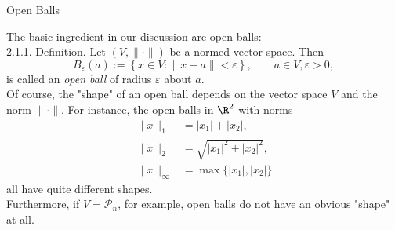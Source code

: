 \documentclass[smaller,hyperref={CJKbookmarks=true}]{beamer}
\begin{document}
\begin{frame}[t,shrink]{Open Balls}
\begin{spacing}{1}
The basic ingredient in our discussion are open balls:\\
\alert{2.1.1. Definition.} Let $(V,\|\cdot\|)$ be a normed vector space. Then
\setcounter{equation}{0}
\begin{equation}\label{2.1.1}
  B_\varepsilon(a):=\left\{x\in V:\|x-a\|<\varepsilon\right\},\qquad a\in V,\varepsilon>0,
\end{equation}
is called an \emph{open ball} of radius $\varepsilon$ about $a$.\\[7pt]
Of course, the "shape" of an open ball depends on the vector space $V$ and the norm $\|\cdot\|$. For instance, the open balls in $\R^2$ with norms
\begin{equation}\label{2.1.2}
  \begin{aligned}
  \|x\|_1&=|x_1|+|x_2|,\\
  \|x\|_2&=\sqrt{|x_1|^2+|x_2|^2},\\
  \|x\|_{\infty}&=\max\{|x_1|,|x_2|\}
  \end{aligned}
\end{equation}
all have quite dif{}ferent shapes.\\
Furthermore, if $V=\mathcal{P}_n$, for example, open balls do not have an obvious "shape" at all.
\end{spacing}
\end{frame}
\end{document}
